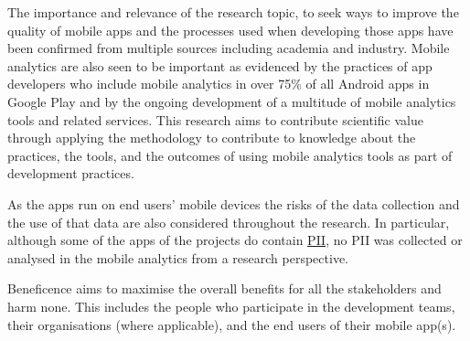 

The importance and relevance of the research topic, to seek ways to improve the quality of mobile apps and the processes used when developing those apps have been confirmed from multiple sources including academia and industry. Mobile analytics are also seen to be important as evidenced by the practices of app developers who include mobile analytics in over 75\% of all Android apps in Google Play and by the ongoing development of a multitude of mobile analytics tools and related services. This research aims to contribute scientific value through applying the methodology to contribute to knowledge about the practices, the tools, and the outcomes of using mobile analytics tools as part of development practices. 

As the apps run on end users' mobile devices the risks of the data collection and the use of that data are also considered throughout the research. In particular, although some of the apps of the projects do contain \href{glossary-pii}{PII}, no PII was collected or analysed in the mobile analytics from a research perspective.



Beneficence aims to maximise the overall benefits for all the stakeholders and harm none. This includes the people who participate in the development teams, their organisations (where applicable), and the end users of their mobile app(s).

